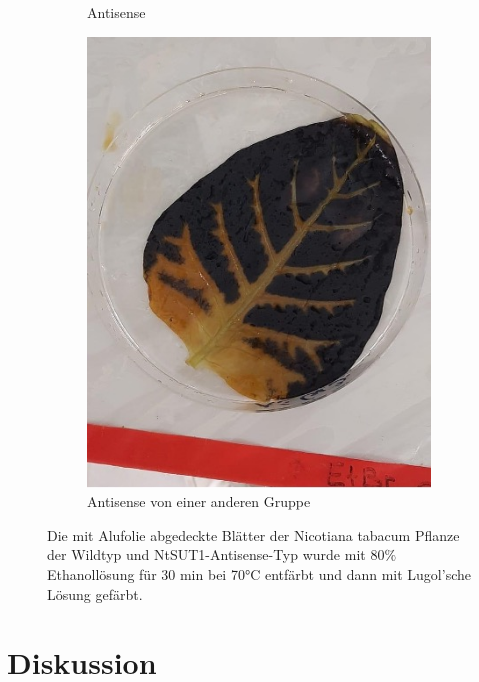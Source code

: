 \documentclass[10pt,a4paper]{article}
\begin{document}
\begin{figure}[H]
\begin{subfigure}[b]{0.345\textwidth}
				\caption{Antisense}
				\label{fig:antisensefärbung}
			\end{subfigure}
			\hfill
			\begin{subfigure}[b]{0.26\textwidth}
				\includegraphics[width=\textwidth]{antisenseblattfail.jpg}
				\caption{Antisense von einer anderen Gruppe}
				\label{fig:antisense fail färbung}
			\end{subfigure}
			\hfill
			\caption{Die mit Alufolie abgedeckte Blätter der Nicotiana tabacum Pflanze der Wildtyp und NtSUT1-Antisense-Typ wurde mit 80$\%$ Ethanollösung für 30 min bei 70°C entfärbt und dann mit Lugol'sche Lösung gefärbt. }
			\label{fig:dunkelfärbung}
		\end{figure}
		
	
	\section{Diskussion}
\end{document}
